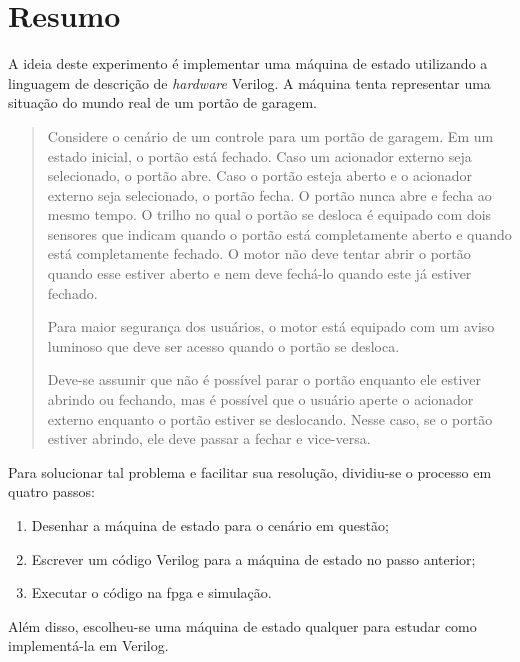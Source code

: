 \chapter{Resumo}
	A ideia deste experimento é implementar uma máquina de estado utilizando a linguagem de descrição
	de \textit{hardware} Verilog.
	A máquina tenta representar uma situação do mundo real de um portão de garagem.

	\begin{quote}
		Considere o cenário de um controle para um portão de garagem. Em um estado inicial, o portão
		está fechado. Caso um acionador externo seja selecionado, o portão abre. Caso o portão esteja
		aberto e o acionador externo seja selecionado, o portão fecha. O portão nunca abre e fecha ao
		mesmo tempo. O trilho no qual o portão se desloca é equipado com dois sensores que indicam
		quando o portão está completamente aberto e quando está completamente fechado. O motor
		não deve tentar abrir o portão quando esse estiver aberto e nem deve fechá-lo quando este já
		estiver fechado.

		Para maior segurança dos usuários, o motor está equipado com um aviso luminoso que deve ser
		acesso quando o portão se desloca.

		Deve-se assumir que não é possível parar o portão enquanto ele estiver abrindo ou fechando,
		mas é possível que o usuário aperte o acionador externo enquanto o portão estiver se
		deslocando. Nesse caso, se o portão estiver abrindo, ele deve passar a fechar e vice-versa.
	\end{quote}

	Para solucionar tal problema e facilitar sua resolução, dividiu-se o processo em quatro passos:
	\begin{enumerate}
	   \item Desenhar a máquina de estado para o cenário em questão;
	   \item Escrever um código Verilog para a máquina de estado no passo anterior;
	   \item Executar o código na \ac{fpga} e simulação.
	 \end{enumerate}

	 Além disso, escolheu-se uma máquina de estado qualquer para estudar como
	 implementá-la em Verilog.

